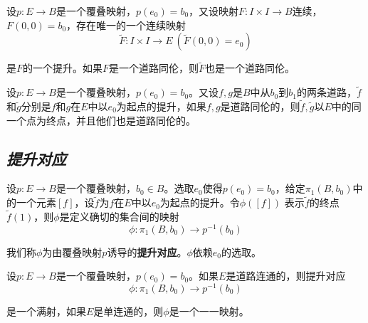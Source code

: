 \begin{mdframed}
    \begin{lemma}
        设$p:E\rightarrow B$是一个覆叠映射，$p(e_0)=b_0$，又设映射$F:I\times I\rightarrow B$连续，$F(0,0)=b_0$，存在唯一的一个连续映射
        \begin{equation}
            \tilde{F}:I\times I\rightarrow E\ (\tilde{F}(0,0)=e_0)
        \end{equation}

        是$F$的一个提升。如果$F$是一个道路同伦，则$\tilde{F}$也是一个道路同伦。
    \end{lemma}
\end{mdframed}

\begin{mdframed}
    \begin{theorem}
        设$p:E\rightarrow B$是一个覆叠映射，$p(e_0)=b_0$。又设$f,g$是$B$中从$b_0$到$b_1$的两条道路，$\tilde{f}$和$\tilde{g}$分别是$f$和$g$在$E$中以$e_0$为起点的提升，如果$f,g$是道路同伦的，则$\tilde{f},\tilde{g}$以$E$中的同一个点为终点，并且他们也是道路同伦的。
    \end{theorem}
\end{mdframed}

\subsection*{\textsl{提升对应}}

\begin{define}
    设$p:E\rightarrow B$是一个覆叠映射，$b_0\in B$。选取$e_0$使得$p(e_0)=b_0$，给定$\pi_1(B,b_0)$中的一个元素$[f]$，设$\tilde{f}$为$f$在$E$中以$e_0$为起点的提升。令$\phi([f])$
    表示$\tilde{f}$的终点$\tilde{f}(1)$，则$\phi$是定义确切的集合间的映射
    \begin{equation}
        \phi:\pi_1(B,b_0)\rightarrow p^{-1}(b_0)
    \end{equation}

    我们称$\phi$为由覆叠映射$p$诱导的\textbf{提升对应}。$\phi$依赖$e_0$的选取。
\end{define}

\begin{mdframed}
    \begin{theorem}
        设$p:E\rightarrow B$是一个覆叠映射，$p(e_0)=b_0$。如果$E$是道路连通的，则提升对应
        \begin{equation}
            \phi:\pi_1(B,b_0)\rightarrow p^{-1}(b_0)
        \end{equation}

        是一个满射，如果$E$是单连通的，则$\phi$是一个一一映射。
    \end{theorem}
\end{mdframed}

